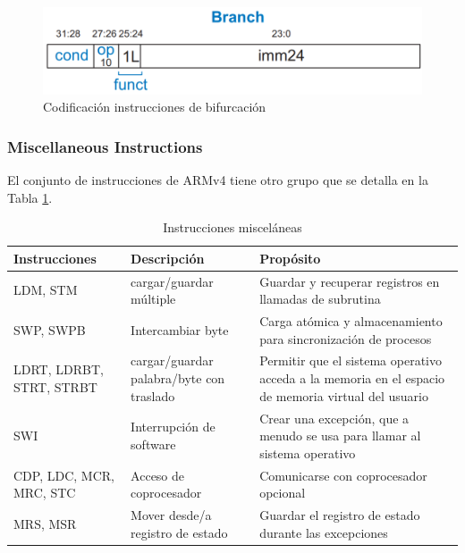 \documentclass[journal,trans]{IEEEtran}
\begin{document}
	\begin{figure}[htbp]
		\centering
		\includegraphics[width=\linewidth]{img/brpro.png}
		\caption{Codificación instrucciones de bifurcación \cite{SarahLHarris2010}}
		\label{fig:BranchP}
	\end{figure}

	\subsubsection{Miscellaneous Instructions}
	El conjunto de instrucciones de ARMv4 tiene otro grupo que se detalla en la Tabla \ref{tab:MISCP}.
	
	\begin{table}[htbp]
		\centering
		\begin{tabular}{|p{2cm}|p{2cm}|p{3cm}|}
			\hline
			Instrucciones            & Descripción                             & Propósito \\
			\hline
			\hline
			LDM, STM                 & cargar/guardar múltiple                 & Guardar y recuperar registros en llamadas de subrutina \\
			\hline
			SWP, SWPB                & Intercambiar byte                       & Carga atómica y almacenamiento para sincronización de procesos \\
			\hline
			LDRT, LDRBT, STRT, STRBT & cargar/guardar palabra/byte con traslado& Permitir que el sistema operativo acceda a la memoria en el espacio de memoria virtual del usuario \\
			\hline
			SWI                      & Interrupción de software                & Crear una excepción, que a menudo se usa para llamar al sistema operativo \\
			\hline
			CDP, LDC, MCR, MRC, STC  & Acceso de coprocesador                  & Comunicarse con coprocesador opcional \\
			\hline
			MRS, MSR                 & Mover desde/a registro de estado        & Guardar el registro de estado durante las excepciones \\
			\hline
		\end{tabular}
		\caption{Instrucciones misceláneas}
		\label{tab:MISCP}
	\end{table}
\end{document}
